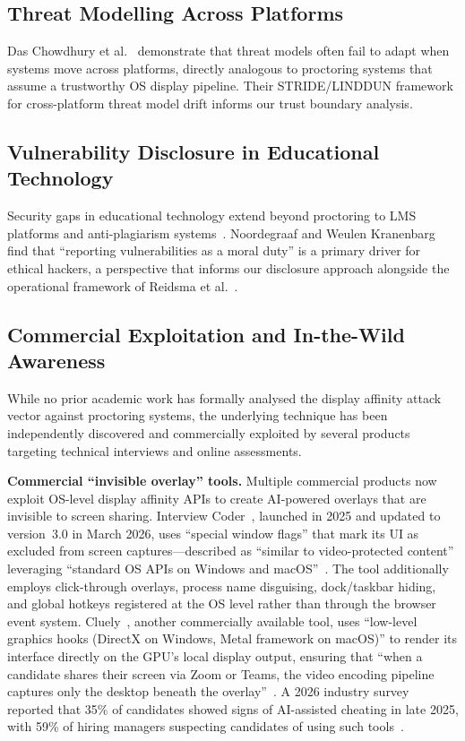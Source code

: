 \documentclass[conference]{IEEEtran}
\begin{document}
\subsection{Threat Modelling Across Platforms}

Das Chowdhury et al.~\cite{daschowdhury2024threat} demonstrate that threat models often fail to adapt when systems move across platforms, directly analogous to proctoring systems that assume a trustworthy OS display pipeline. Their STRIDE/LINDDUN framework for cross-platform threat model drift informs our trust boundary analysis.

\subsection{Vulnerability Disclosure in Educational Technology}

Security gaps in educational technology extend beyond proctoring to LMS platforms and anti-plagiarism systems~\cite{mehrishi2025cryptography,lachheb2023role,adkins2022scaling}. Noordegraaf and Weulen Kranenbarg~\cite{noordegraaf2023ethical} find that ``reporting vulnerabilities as a moral duty'' is a primary driver for ethical hackers, a perspective that informs our disclosure approach alongside the operational framework of Reidsma et al.~\cite{reidsma2023operationalizing}.

\subsection{Commercial Exploitation and In-the-Wild Awareness}

While no prior academic work has formally analysed the display affinity attack vector against proctoring systems, the underlying technique has been independently discovered and commercially exploited by several products targeting technical interviews and online assessments.

\textbf{Commercial ``invisible overlay'' tools.} Multiple commercial products now exploit OS-level display affinity APIs to create AI-powered overlays that are invisible to screen sharing. Interview Coder~\cite{interviewcoder2026}, launched in 2025 and updated to version~3.0 in March 2026, uses ``special window flags'' that mark its UI as excluded from screen captures---described as ``similar to video-protected content'' leveraging ``standard OS APIs on Windows and macOS''~\cite{openpr2026interviewcoder}. The tool additionally employs click-through overlays, process name disguising, dock/taskbar hiding, and global hotkeys registered at the OS level rather than through the browser event system. Cluely~\cite{cluely2025}, another commercially available tool, uses ``low-level graphics hooks (DirectX on Windows, Metal framework on macOS)'' to render its interface directly on the GPU's local display output, ensuring that ``when a candidate shares their screen via Zoom or Teams, the video encoding pipeline captures only the desktop beneath the overlay''~\cite{fabrichq2026cheating}. A 2026 industry survey reported that 35\% of candidates showed signs of AI-assisted cheating in late 2025, with 59\% of hiring managers suspecting candidates of using such tools~\cite{fabrichq2026cheating}.
\end{document}
